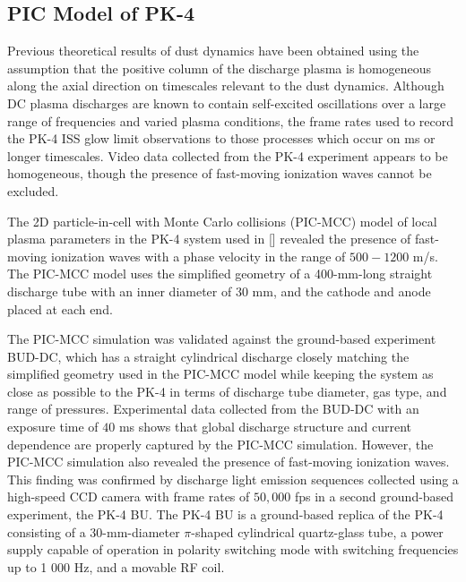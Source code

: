 \documentclass[aip,amsmath,amssymb,graphicx,floatfix,reprint]{revtex4-1}
\begin{document}
\subsection{PIC Model of PK-4}
\label{PIC model}
Previous theoretical results of dust dynamics have been obtained using the assumption that the positive column of the discharge plasma is homogeneous along the axial direction on timescales relevant to the dust dynamics\cite{Sukhinin2013}.  Although DC plasma discharges are known to contain self-excited oscillations over a large range of frequencies and varied plasma conditions\cite{Rohlena1972}, the frame rates used to record the PK-4 ISS glow limit observations to those processes which occur on ms or longer timescales\cite{Pustylnik2016}.  Video data collected from the PK-4 experiment appears to be homogeneous, though the presence of fast-moving ionization waves cannot be excluded.  

The 2D particle-in-cell with Monte Carlo collisions (PIC-MCC) model\cite{Donko2021} of local plasma parameters in the PK-4 system used in [] revealed the presence of fast-moving ionization waves with a phase velocity in the range of $500-1200$ m/s.  The PIC-MCC model uses the simplified geometry of a 400-mm-long straight discharge tube with an inner diameter of 30 mm, and the cathode and anode placed at each end.  

The PIC-MCC simulation was validated against the ground-based experiment BUD-DC, which has a straight cylindrical discharge closely matching the simplified geometry used in the PIC-MCC model while keeping the system as close as possible to the PK-4 in terms of discharge tube diameter, gas type, and range of pressures\cite{Hartmann2020}.  Experimental data collected from the BUD-DC with an exposure time of $40$ ms shows that global discharge structure and current dependence are properly captured by the PIC-MCC simulation.  However, the PIC-MCC simulation also revealed the presence of fast-moving ionization waves.  This finding was confirmed by discharge light emission sequences collected using a high-speed CCD camera with frame rates of $50, 000$ fps in a second ground-based experiment, the PK-4 BU.  The PK-4 BU is a ground-based replica of the PK-4 consisting of a 30-mm-diameter $\pi$-shaped cylindrical quartz-glass tube, a power supply capable of operation in polarity switching mode with switching frequencies up to 1 000 Hz, and a movable RF coil\cite{Schmidt2020}. 
\end{document}
